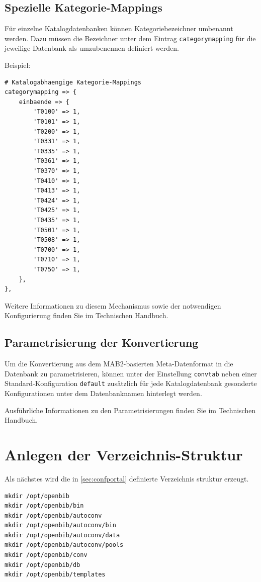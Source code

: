 \documentclass[11pt, twoside, a4paper, BCOR8mm, DIV12, bibtotoc,idxtotoc]{scrbook}
\begin{document}
\subsection{Spezielle Kategorie-Mappings}

Für einzelne Katalogdatenbanken können Kategoriebezeichner umbenannt
werden. Dazu müssen die Bezeichner unter dem Eintrag
\texttt{categorymapping} für die jeweilige Datenbank als umzubenennen
definiert werden.

Beispiel:

\begin{verbatim}
# Katalogabhaengige Kategorie-Mappings
categorymapping => {
    einbaende => {
        'T0100' => 1,
        'T0101' => 1,
        'T0200' => 1,
        'T0331' => 1,
        'T0335' => 1,
        'T0361' => 1,
        'T0370' => 1,
        'T0410' => 1,
        'T0413' => 1,
        'T0424' => 1,
        'T0425' => 1,
        'T0435' => 1,
        'T0501' => 1,
        'T0508' => 1,
        'T0700' => 1,
        'T0710' => 1,
        'T0750' => 1,
    },    
},
\end{verbatim}

Weitere Informationen zu diesem Mechanismus sowie der notwendigen
Konfigurierung finden Sie im Technischen Handbuch.


\subsection{Parametrisierung der Konvertierung}

Um die Konvertierung aus dem MAB2-basierten Meta-Datenformat in die
Datenbank zu parametrisieren, können unter der Einstellung
\texttt{convtab} neben einer Standard-Konfiguration \texttt{default}
zusätzlich für jede Katalogdatenbank gesonderte Konfigurationen unter
dem Datenbanknamen hinterlegt werden.

Ausführliche Informationen zu den Parametrisierungen finden Sie im
Technischen Handbuch.

\section{Anlegen der Verzeichnis-Struktur}

Als nächstes wird die in \ref{sec:confportal} definierte Verzeichnis
struktur erzeugt.

\begin{verbatim}
mkdir /opt/openbib
mkdir /opt/openbib/bin
mkdir /opt/openbib/autoconv
mkdir /opt/openbib/autoconv/bin
mkdir /opt/openbib/autoconv/data
mkdir /opt/openbib/autoconv/pools
mkdir /opt/openbib/conv
mkdir /opt/openbib/db
mkdir /opt/openbib/templates
\end{verbatim}
\end{document}
